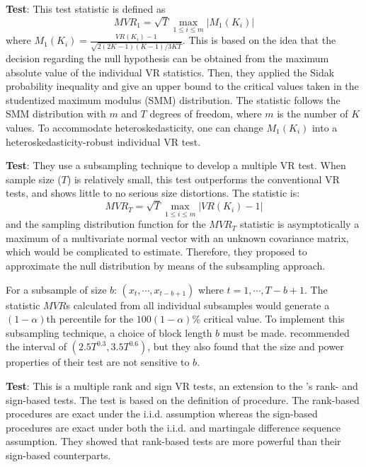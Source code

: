 \textbf{\citet{chow1993simple} Test}: This test statistic is defined as 
$$MVR_1=\sqrt{T}\max_{1\leq i \leq m}|M_1(K_i)|$$
where $M_1(K_i) = \frac{VR(K_i)-1}{\sqrt{2(2K-1)(K-1)/3KT}}$. This is based on the idea that the decision regarding the null hypothesis can be obtained from the maximum absolute value of
the individual VR statistics. Then, they applied the Sidak probability inequality and give an upper bound to the critical values taken in the studentized maximum modulus (SMM) distribution.
The statistic follows the SMM distribution with $m$ and $T$ degrees of freedom, where $m$ is the number of $K$ values. To accommodate heteroskedasticity, one can change $M_1(K_i)$ into 
a heteroskedasticity-robust individual VR test.

\textbf{\cite{whang2003multiple} Test}: They use a subsampling technique to develop a multiple VR test. When sample size ($T$) is relatively small, this test outperforms the conventional VR
tests, and shows little to no serious size distortions. The statistic is:
$$
MVR_T = \sqrt{T}\max_{1\leq i \leq m}|VR(K_i)-1|
$$
and the sampling distribution function for the $MVR_T$ statistic is asymptotically a maximum of a multivariate normal vector with an unknown covariance matrix, which would be complicated to
estimate. Therefore, they proposed to approximate the null distribution by means of the subsampling approach.

For a subsample of size $b$: $(x_t,\cdots,x_{t-b+1})$ where $t=1,\cdots,T-b+1$. The statistic $MVR$s calculated from all individual subsamples would generate a $(1-\alpha)$th percentile for the
$100(1-\alpha)\%$ critical value. To implement this subsampling technique, a choice of block length $b$ must be made. \citet{whang2003multiple} recommended the interval of 
$(2.5T^{0.3},3.5T^{0.6})$, but they also found that the size and power properties of their test are not sensitive to $b$.

\textbf{\cite{belaire2004ranks} Test}: This is a multiple rank and sign VR tests, an extension to the \citeauthor{wright2000alternative}'s rank- and sign-based tests. The test is based on 
the definition of \citet{chow1993simple} procedure. The rank-based procedures are exact under the i.i.d. assumption whereas the sign-based procedures are exact under both the i.i.d. and
martingale difference sequence assumption. They showed that rank-based tests are more powerful than their sign-based counterparts.
